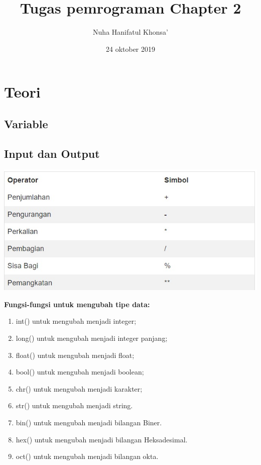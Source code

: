 \documentclass[a4paper,12pt]{report}
\title{Tugas pemrograman Chapter 2}
\author{Nuha Hanifatul Khonsa'}
\date{24 oktober 2019}
\begin{document}
\maketitle


\section{Teori}
\subsection{Variable}
\usepackage{Variable adalah sebuah wadah yang memiliki nilai. Variable dapat dituliskan dengan sederhana seperti berikut: dimana nama variable = nilai. jika nama variable diisi npm maka nilai yang dimasukkan ialah 1184085.  Dalam variable exsplorer pada Python berisikan nama, type data serta value dari variable yang ada dalam syntax Python}

\subsection{Input dan Output}
\usepackage{Input dalam Python adalah sebuah masukan dari user kemudian diproses kepada program dan program memberikan output pada user. Input dan Output ialah hal paling penting dari sebuah program. 
inputan bisa dari value dari sebuah variable dan output adalah print atau hasil dari nilai sebuah variable. }

\usepackage{Operator aritmatika adalah simbol aritmatika yang berlaku dalam Python, Sama halnya dengan operator aritmatika lain yang ada seprti jumlah, bagi, kurang, kali, dll,}
\begin{center}
        \includegraphics[width=8cm\textwidth]{aritmatika.jpg}
\end{center}

\textbf{Fungsi-fungsi untuk mengubah tipe data:}
\begin{enumerate}
    \item int() untuk mengubah menjadi integer;
    \item long() untuk mengubah menjadi integer panjang;
    \item float() untuk mengubah menjadi float;
    \item bool() untuk mengubah menjadi boolean;
    \item chr() untuk mengubah menjadi karakter;
    \item str() untuk mengubah menjadi string.
    \item bin() untuk mengubah menjadi bilangan Biner.
    \item hex() untuk mengubah menjadi bilangan Heksadesimal.
    \item oct() untuk mengubah menjadi bilangan okta.
\end{enumerate}
\end{document}
